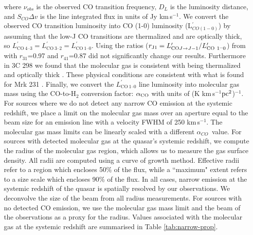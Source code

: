 \documentclass[twocolumn]{aastex63}
\newcommand{\kms}{km\,s$^{-1}$}
\newcommand{\alphaco}{$\alpha_{CO}$}
\begin{document}
\noindent 
where $\nu_{obs}$ is the observed CO transition frequency, $D_{L}$ is the luminosity distance, and $S_{CO}\Delta v$ is the line integrated flux in units of Jy \kms. We convert the observed CO transition luminosity into CO (1-0) luminosity (L$^{'}_{CO(1-0)}$) by assuming that the low-J CO transitions are thermalized and are optically thick, so ${L}_{\mathrm{CO}\ 4\mbox{--}3}^{{\prime} }={L}_{\mathrm{CO}\ 3\mbox{--}2}^{{\prime} } ={L}_{\mathrm{CO}\ 1\mbox{--}0}^{{\prime} }$. Using the ratios (${r}_{{\rm{J}}1}={L}_{\mathrm{CO}J\to J-1}^{{\prime} }/{L}_{\mathrm{CO}\ 1\mbox{--}0}^{{\prime} }$) from \cite{CarillinWalter13} with $r_{31}$=0.97 and $r_{41}$=0.87 did not significantly change our results. Furthermore in 3C 298 we found that the molecular gas is consistent with being thermalized and optically thick \citep{Vayner17}. These physical conditions are consistent with what is found for Mrk 231 \citep{Feruglio15}. Finally, we convert the ${L}_{\mathrm{CO}\ 1\mbox{--}0}^{{\prime}}$ line luminosity into molecular gas mass using the CO-to-H$_{2}$ conversion factor: $\alpha_{\rm CO}$ with units of (K \kms$\rm pc^{2}$)$^{-1}$. For sources where we do not detect any narrow CO emission at the systemic redshift, we place a limit on the molecular gas mass over an aperture equal to the beam size for an emission line with a velocity FWHM of 250 \kms. The molecular gas mass limits can be linearly scaled with a different \alphaco\ value. For sources with detected molecular gas at the quasar's systemic redshift, we compute the radius of the molecular gas region, which allows us to measure the gas surface density. All radii are computed using a curve of growth method. Effective radii refer to a region which encloses 50\% of the flux, while a ``maximum" extent refers to a size scale which encloses 90\% of the flux. In all cases, narrow emission at the systemic redshift of the quasar is spatially resolved by our observations. We deconvolve the size of the beam from all radius measurements. For sources with no detected CO emission, we use the molecular gas mass limit and the beam of the observations as a proxy for the radius. Values associated with the molecular gas at the systemic redshift are summarised in Table \ref{tab:narrow-prop}.
\end{document}
